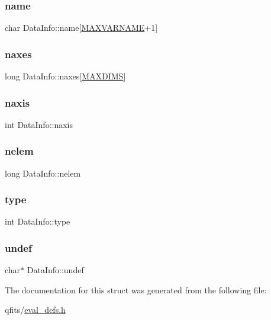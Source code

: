 \subsubsection{\texorpdfstring{name}{name}}
{\footnotesize\ttfamily char Data\+Info\+::name\mbox{[}\hyperlink{eval__defs_8h_a0de1b3c58ac1d494cebc79ea7e01c234}{M\+A\+X\+V\+A\+R\+N\+A\+ME}+1\mbox{]}}

\mbox{\label{struct_data_info_ac230b052c60c1ebab3797df1bfdc0ede}} 
\subsubsection{\texorpdfstring{naxes}{naxes}}
{\footnotesize\ttfamily long Data\+Info\+::naxes\mbox{[}\hyperlink{eval__defs_8h_a45ed35a158331b8f57fd66c5a18fa835}{M\+A\+X\+D\+I\+MS}\mbox{]}}

\mbox{\label{struct_data_info_a2b54736d7c2400cbed1746187fc96678}} 
\subsubsection{\texorpdfstring{naxis}{naxis}}
{\footnotesize\ttfamily int Data\+Info\+::naxis}

\mbox{\label{struct_data_info_a18d46d5c799d1e281161cd4e2b2e57d2}} 
\subsubsection{\texorpdfstring{nelem}{nelem}}
{\footnotesize\ttfamily long Data\+Info\+::nelem}

\mbox{\label{struct_data_info_a217c120c417bd34e477e695623880d5f}} 
\subsubsection{\texorpdfstring{type}{type}}
{\footnotesize\ttfamily int Data\+Info\+::type}

\mbox{\label{struct_data_info_a7620adc9025b976f11c9d1c0c173959f}} 
\subsubsection{\texorpdfstring{undef}{undef}}
{\footnotesize\ttfamily char$\ast$ Data\+Info\+::undef}



The documentation for this struct was generated from the following file\+:\begin{DoxyCompactItemize}
\item 
qfits/\hyperlink{eval__defs_8h}{eval\+\_\+defs.\+h}\end{DoxyCompactItemize}
